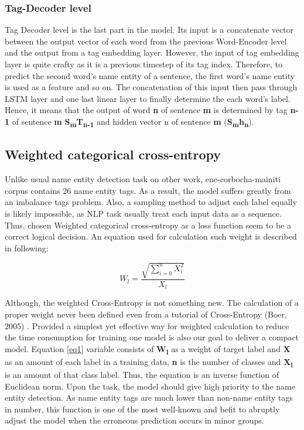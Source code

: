 \begin{CJK*}{UTF8}{min}
\subsubsection{Tag-Decoder level}
Tag Decoder level is the last part in the model.
Its input is a concatenate vector between the output vector of each word from the previous Word-Encoder level and the output from a tag embedding layer.
However, the input of tag embedding layer is quite crafty as it is a previous timestep of its tag index.
Therefore, to predict the second word's name entity of a sentence, the first word's name entity is used as a feature and so on.
The concatenation of this input then pass through LSTM layer and one last linear layer to finally determine the each word's label.
Hence, it means that the output of word \textbf{n} of sentence \textbf{m} is determined by tag \textbf{n-1} of sentence \textbf{m} \textbf{S\textsubscript{m}T\textsubscript{n-1}} and hidden vector n of sentence \textbf{m} (\textbf{S\textsubscript{m}h\textsubscript{n}}).

\subsection{Weighted categorical cross-entropy}
Unlike usual name entity detection task on other work, ene-corbocha-mainiti corpus contains 26 name entity tags.
As a result, the model suffers greatly from an imbalance tags problem.
Also, a sampling method to adjust each label equally is likely impossible, as NLP task usually treat each input data as a sequence.
Thus, chosen Weighted categorical cross-entropy as a loss function
seem to be a correct logical decision.
An equation used for calculation such weight is described in following: 

\begin{equation} \label{eq1}
W_l = \frac{
    \sqrt{
    \sum_{i=0}^{n} X_i^2
    }
}{X_l} 
\end{equation}

Although, the weighted Cross-Entropy is not something new.
The calculation of a proper weight never been defined even from a tutorial of Cross-Entropy (Boer, 2005) \cite{750fabedbacb467c8fafd98b87f77436}.
Provided a simplest yet effective way for weighted calculation to reduce the time consumption for training one model is also our goal to deliver a compact model.
Equation \ref{eq1} variable consists of \textbf{W\textsubscript{l}} as a weight of target label and \textbf{X} as an amount of each label in a training data, \textbf{n} is the number of classes and \textbf{X\textsubscript{l}} is an amount of that class label.
Thus, the equation is an inverse function of Euclidean norm.
Upon the task, the model should give high priority to the name entity detection.
As name entity tags are much lower than non-name entity tags in number, this function is one of the most well-known and befit to abruptly adjust the model when the erroneous prediction occurs in minor groups.



\end{CJK*}
